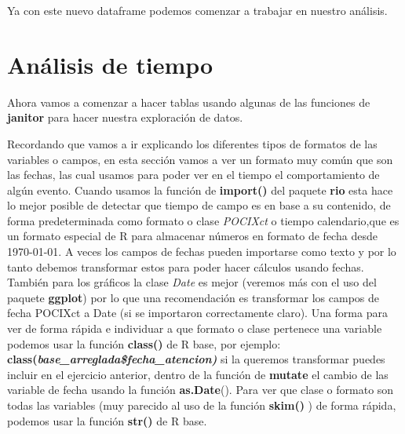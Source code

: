 \documentclass[
  letterpaper,
  DIV=11,
  numbers=noendperiod]{scrreprt}
\begin{document}
Ya con este nuevo dataframe podemos comenzar a trabajar en nuestro
análisis.

\section{Análisis de tiempo}\label{anuxe1lisis-de-tiempo}

Ahora vamos a comenzar a hacer tablas usando algunas de las funciones de
\textbf{janitor} para hacer nuestra exploración de datos.

Recordando que vamos a ir explicando los diferentes tipos de formatos de
las variables o campos, en esta sección vamos a ver un formato muy común
que son las fechas, las cual usamos para poder ver en el tiempo el
comportamiento de algún evento. Cuando usamos la función de
\textbf{import()} del paquete \textbf{rio} esta hace lo mejor posible de
detectar que tiempo de campo es en base a su contenido, de forma
predeterminada como formato o clase \emph{POCIXct} o tiempo
calendario,que es un formato especial de R para almacenar números en
formato de fecha desde 1970-01-01. A veces los campos de fechas pueden
importarse como texto y por lo tanto debemos transformar estos para
poder hacer cálculos usando fechas. También para los gráficos la clase
\emph{Date} es mejor (veremos más con el uso del paquete
\textbf{ggplot}) por lo que una recomendación es transformar los campos
de fecha POCIXct a Date (si se importaron correctamente claro). Una
forma para ver de forma rápida e individuar a que formato o clase
pertenece una variable podemos usar la función \textbf{class()} de R
base, por ejemplo:
\textbf{class(\emph{base\_arreglada\$fecha\_atencion)}} si la queremos
transformar puedes incluir en el ejercicio anterior, dentro de la
función de \textbf{mutate} el cambio de las variable de fecha usando la
función \textbf{as.Date}(). Para ver que clase o formato son todas las
variables (muy parecido al uso de la función \textbf{skim()} ) de forma
rápida, podemos usar la función \textbf{str()} de R base.
\end{document}
